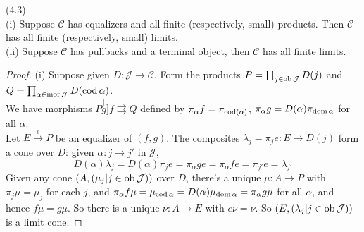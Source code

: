 \documentclass[a4paper]{article}
\begin{document}
\begin{thm} (4.3)\\
    (i) Suppose $\mathcal{C}$ has equalizers and all finite (respectively, small) products. Then $\mathcal{C}$ has all finite (respectively, small) limits.\\
    (ii) Suppose $\mathcal{C}$ has pullbacks and a terminal object, then $\mathcal{C}$ has all finite limits.
    \begin{proof}
        (i) Suppose given $D:\mathcal{J} \to \mathcal{C}$. Form the products $P=\prod_{j \in \operatorname{ob}\mathcal{J}} D(j)$ and $Q = \prod_{\alpha \in \operatorname{mor}\mathcal{J}} D(\operatorname{cod} \alpha)$.\\
        We have morphisms $P \stackrel[g]{f}{\rightrightarrows} Q$ defined by $\pi_\alpha f = \pi_{\operatorname{cod}(\alpha)}$, $\pi_\alpha g = D(\alpha) \pi_{\operatorname{dom} \alpha}$ for all $\alpha$.\\
        Let $E \xrightarrow{e} P$ be an equalizer of $(f,g)$. The composites $\lambda_j = \pi_j e: E \to D(j)$ form a cone over $D$: given $\alpha: j \to j'$ in $\mathcal{J}$, 
        $$D(\alpha) \lambda_j = D(\alpha) \pi_j e = \pi_\alpha ge = \pi_\alpha fe = \pi_{j'} e = \lambda_{j'}$$
        Given any cone $(A,(\mu_j | j \in \operatorname{ob}\mathcal{J}))$ over $D$, there's a unique $\mu:A \to P$ with $\pi_j \mu = \mu_j$ for each $j$, and $\pi_\alpha f \mu = \mu_{\operatorname{cod} \alpha} = D(\alpha) \mu_{\operatorname{dom} \alpha} = \pi_\alpha g\mu$ for all $\alpha$, and hence $f\mu = g\mu$. So there is a unique $\nu:A \to E$ with $e\nu = \nu$. So $(E,(\lambda_j | j \in \operatorname{ob} \mathcal{J}))$ is a limit cone.


\end{proof}
\end{thm}
\end{document}

